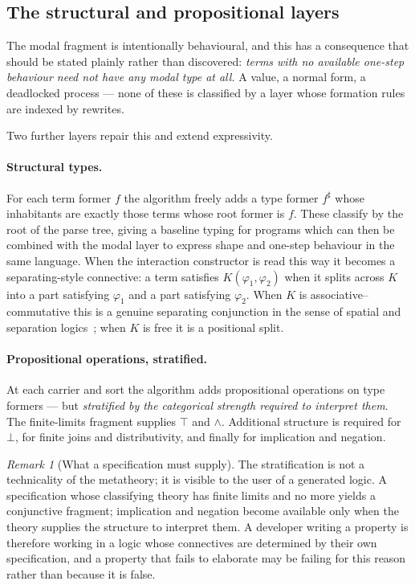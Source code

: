 \documentclass[11pt]{article}
\theoremstyle{definition}
\theoremstyle{plain}
\theoremstyle{remark}
\newtheorem{remark}[definition]{Remark}
\begin{document}
\subsection{The structural and propositional layers}

The modal fragment is intentionally behavioural, and this has a consequence that should
be stated plainly rather than discovered: \emph{terms with no available one-step behaviour
need not have any modal type at all.} A value, a normal form, a deadlocked process ---
none of these is classified by a layer whose formation rules are indexed by rewrites.

Two further layers repair this and extend expressivity.

\paragraph{Structural types.} For each term former $f$ the algorithm freely adds a type
former $f^\sharp$ whose inhabitants are exactly those terms whose root former is $f$.
These classify by the root of the parse tree, giving a baseline typing for programs which
can then be combined with the modal layer to express shape and one-step behaviour in the
same language. When the interaction constructor is read this way it becomes a
separating-style connective: a term satisfies $K(\varphi_1,\varphi_2)$ when it splits
across $K$ into a part satisfying $\varphi_1$ and a part satisfying $\varphi_2$. When $K$
is associative--commutative this is a genuine separating conjunction in the sense of
spatial and separation logics~\cite{CairesCardelli2003,Reynolds2002}; when $K$ is free it
is a positional split.

\paragraph{Propositional operations, stratified.} At each carrier and sort the algorithm
adds propositional operations on type formers --- but \emph{stratified by the categorical
strength required to interpret them}. The finite-limits fragment supplies $\top$ and
$\wedge$. Additional structure is required for $\bot$, for finite joins and
distributivity, and finally for implication and negation.

\begin{remark}[What a specification must supply]
\label{rem:stratification}
The stratification is not a technicality of the metatheory; it is visible to the user of
a generated logic. A specification whose classifying theory has finite limits and no more
yields a conjunctive fragment; implication and negation become available only when the
theory supplies the structure to interpret them. A developer writing a property is
therefore working in a logic whose connectives are determined by their own specification,
and a property that fails to elaborate may be failing for this reason rather than because
it is false.
\end{remark}
\end{document}
